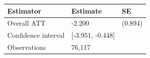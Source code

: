 
\begin{tabular}{lll}
\toprule
Estimator & Estimate & SE\\
\midrule
Overall ATT & -2.200 & (0.894)\\
Confidence interval & {}[-3.951, -0.448] & \\
Observations & 76,117 & \\
\bottomrule
\end{tabular}
